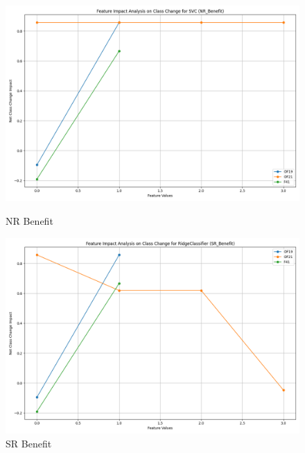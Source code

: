\begin{figure}[H]
    \centering
    \begin{minipage}{0.495\textwidth}
        \centering
        \includegraphics[width=\linewidth]{analysis/images/feature_impact_class_change_NR_Benefit_SVC.png}
        \caption{NR Benefit}
        \label{fig:nr_ben_class_analysis}
    \end{minipage}\hfill
    \begin{minipage}{0.495\textwidth}
        \centering
        \includegraphics[width=\linewidth]{analysis/images/feature_impact_class_change_SR_Benefit_RidgeClassifier.png}
        \caption{SR Benefit}
        \label{fig:sr_ben_class_analysis}
    \end{minipage}
\end{figure}


